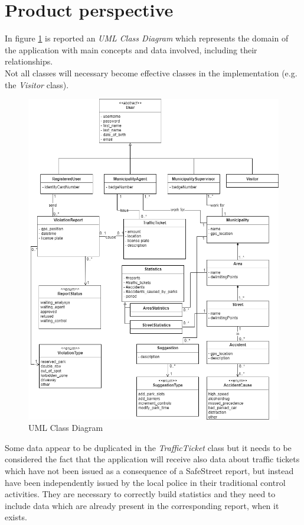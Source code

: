 \documentclass[a4paper]{report}
\begin{document}
\section{Product perspective}
In figure \ref{fig:class-diagram} is reported an \textit{UML Class Diagram} which represents the domain of the application with main concepts and data involved, including their relationships.\\
Not all classes will necessary become effective classes in the implementation (e.g. the \textit{Visitor} class).\\
\begin{figure}[hp]
\includegraphics[width=\textwidth]{ClassDiagram}
\caption{UML Class Diagram}
\label{fig:class-diagram}
\end{figure}
Some data appear to be duplicated in the \textit{TrafficTicket} class but it needs to be considered the fact that the application will receive also data about traffic tickets which have not been issued as a consequence of a SafeStreet report, but instead have been independently issued by the local police in their traditional control activities. They are necessary to correctly build statistics and they need to include data which are already present in the corresponding report, when it exists.\\
\end{document}
